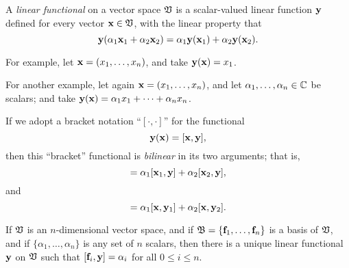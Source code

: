 A {\em linear functional}
on a vector space ${\frak V}$ is a scalar-valued linear function ${\bf y}$
defined for every vector   ${\bf x} \in {\frak V}$, with the linear property that
\begin{equation}
{\bf y} (\alpha_1 {\bf x}_1 +\alpha_2 {\bf x}_2)
=
\alpha_1 {\bf y} ({\bf x}_1) +\alpha_2 {\bf y} ({\bf x}_2) .
\end{equation}

{\color{blue}
\bexample
For example,
let ${\bf x} = (x_1,\ldots , x_n)$, and
take
${\bf y} ({\bf x}) =x_1$.

For another example,
let again ${\bf x} = (x_1,\ldots , x_n)$, and
let $\alpha_1,\ldots , \alpha_n \in {\Bbb C}$ be scalars; and
take
${\bf y} ({\bf x}) =\alpha_1 x_1 + \cdots +\alpha_n x_n$.
\eexample
}


If we adopt a bracket notation ``$[\cdot , \cdot ]$''
for the functional
\begin{equation}
{\bf y} ({\bf x})
=
[{\bf x},{\bf y}],
\end{equation}
then this ``bracket'' functional is
{\em bilinear} in its two arguments; that is,
\begin{equation}
[ \alpha_1 {\bf x}_1 +\alpha_2 {\bf x}_2, {\bf y}]
=
\alpha_1 [{\bf x}_1 ,{\bf y}]  +\alpha_2  [{\bf x}_2,{\bf y}],
\end{equation}
and
\begin{equation}
[
{\bf x}, \alpha_1 {\bf y}_1 +\alpha_2 {\bf y}_2
]
=
\alpha_1
[{\bf x},{\bf y}_1 ]
+
\alpha_2
[{\bf x},{\bf y}_2].
\end{equation}


If ${\frak V}$ is an $n$-dimensional vector space, and if ${\frak B} = \{{\bf f}_1,\ldots , {\bf f}_n\}$
is a basis of  ${\frak V}$, and if
$\{\alpha_1, \ldots ,\alpha_n\}$  is any set of $n$ scalars, then there is
a unique linear functional ${\bf y}$  on  ${\frak V}$ such that
$ [ {\bf f}_i, {\bf y}] = \alpha_i $ for all $0\le i \le n$.

